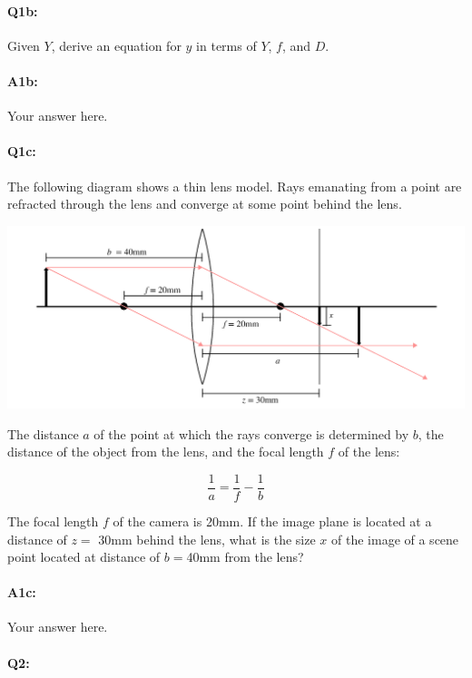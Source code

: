 \pagebreak
\paragraph{Q1b:}
Given $Y$, derive an equation for $y$ in terms of $Y$, $f$, and $D$.

\paragraph{A1b:} Your answer here.

\pagebreak
\paragraph{Q1c:}
The following diagram shows a thin lens model. Rays emanating from a point are refracted through the lens and converge at some point behind the lens. 

\includegraphics[width=1.0\linewidth]{lens.png}

The distance $a$ of the point at which the rays converge is determined by $b$, the distance of the object from the lens, and the focal length $f$ of the lens:

\begin{equation}
\frac{1}{a} = \frac{1}{f} - \frac{1}{b}
\end{equation}

The focal length $f$ of the camera is 20mm. If the image plane is located at a distance of $z =$ 30mm behind the lens, what is the size $x$ of the image of a scene point located at distance of $b = $40mm from the lens? 

\paragraph{A1c:} Your answer here.


\pagebreak
\paragraph{Q2:} 

